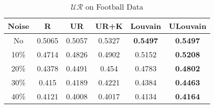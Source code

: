 \documentclass[\main/thesis.tex]{subfiles}
\begin{document}
\begin{table}[h]
\centering
\caption{$\mathcal{UR}$ on Football Data}
\label{unsupervised_football}
\begin{tabular}{|c|c|c|c|c|c|}
\hline
Noise & R      & UR     & UR+K   & Louvain         & ULouvain        \\ \hline
No    & 0.5065 & 0.5057 & 0.5327 & \textbf{0.5497} & \textbf{0.5497} \\ \hline
10\%  & 0.4714 & 0.4826 & 0.4902 & 0.5152          & \textbf{0.5208} \\ \hline
20\%  & 0.4378 & 0.4491 & 0.454  & 0.4783          & \textbf{0.4802} \\ \hline
30\%  & 0.415  & 0.4189 & 0.4221 & 0.4384          & \textbf{0.4463} \\ \hline
40\%  & 0.4121 & 0.4008 & 0.4017 & 0.4134          & \textbf{0.4164} \\ \hline
\end{tabular}
\end{table}

\end{document}
